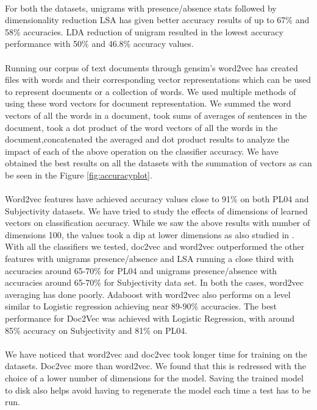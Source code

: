 \documentclass[a4paper,26pt]{article}
\begin{document}
\paragraph{}
For both the datasets, unigrams with presence/absence stats followed by dimensionality reduction LSA has given better accuracy results of up to 67\% and 58\% accuracies. LDA reduction of unigram resulted in the lowest accuracy performance with 50\% and 46.8\% accuracy values. 

\paragraph{}
Running our corpus of text documents through gensim's word2vec has created files with words and their corresponding vector representations which can be used to represent documents or a collection of words. We used multiple methods of using these word vectors for document representation. We summed the word vectors of all the words in a document, took sums of averages of sentences in the document, took a dot product of the word vectors of all the words in the document,concatenated the averaged and dot product results to analyze the impact of each of the above operation on the classifier accuracy. We have obtained the best results on all the datasets with the summation of vectors as can be seen in the Figure \ref{fig:accuracyplot}.

\paragraph{}
Word2vec features have achieved accuracy values close to 91\% on both PL04 and Subjectivity datasets. We have tried to study the effects of dimensions of learned vectors on classification accuracy. While we saw the above results with number of dimensions 100, the values took a dip at lower dimensions as also studied in \cite{dai2015document}. With all the classifiers we tested, doc2vec and word2vec outperformed the other features with unigrams presence/absence and LSA running a close third with accuracies around 65-70\% for PL04 and unigrams presence/absence with accuracies around 65-70\% for Subjectivity data set. In both the cases, word2vec averaging has done poorly. Adaboost with word2vec also performs on a level similar to Logistic regression achieving near 89-90\% accuracies. The best performance for Doc2Vec was achieved with Logistic Regression, with around 85\% accuracy on Subjectivity and 81\% on PL04.

\paragraph{}
We have noticed that word2vec and doc2vec took longer time for training on the datasets. Doc2vec more than word2vec. We found that this is redressed with the choice of a lower number of dimensions for the model. Saving the trained model to disk also helps avoid having to regenerate the model each time a test has to be run.
\end{document}
